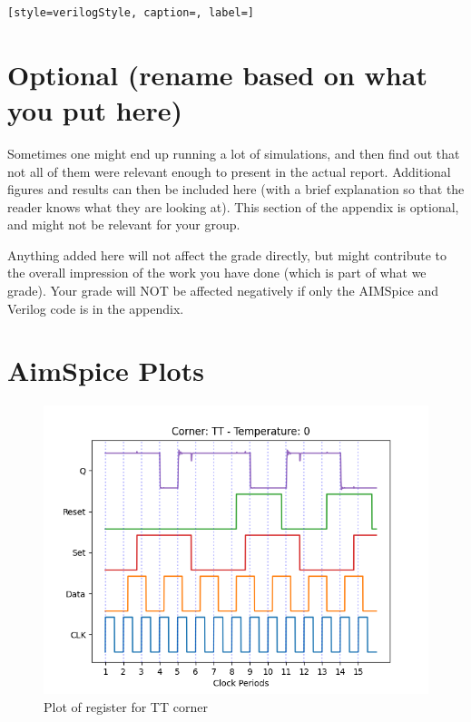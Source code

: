 \begin{lstlisting}[style=verilogStyle, caption=, label=]
\end{lstlisting}

\section{Optional (rename based on what you put here)}
Sometimes one might end up running a lot of simulations, and then find out that not all of them were relevant enough to present in the actual report. Additional figures and results can then be included here (with a brief explanation so that the reader knows what they are looking at). This section of the appendix is optional, and might not be relevant for your group. 

Anything added here will not affect the grade directly, but might contribute to the overall impression of the work you have done (which is part of what we grade). Your grade will NOT be affected negatively if only the AIMSpice and Verilog code is in the appendix.

\section{AimSpice Plots}
\label{appendix:aimspicePlots}

\begin{figure}[H]
    \centering
    \includegraphics[width=\textwidth]{Figures/Aimspice_Plots/TT_0.png}
    \caption{Plot of register for TT corner}
    \label{fig:TT0}
\end{figure}

